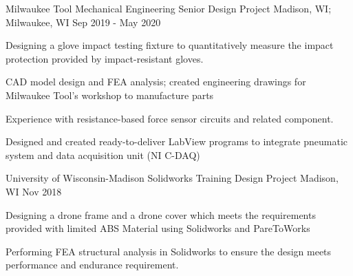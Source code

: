 

\begin{cventries}

  \cventry
    {Milwaukee Tool} %
    {Mechanical Engineering Senior Design Project} %
    {Madison, WI; Milwaukee, WI} %
    {Sep 2019 - May 2020} %
    {
      \begin{cvitems} %
        \item {Designing a glove impact testing fixture to quantitatively measure the impact protection provided by impact-resistant gloves.}
        \item {CAD model design and FEA analysis; created engineering drawings for Milwaukee Tool's workshop to manufacture parts}
        \item {Experience with resistance-based force sensor circuits and related component.}
        \item {Designed and created ready-to-deliver LabView programs to integrate pneumatic system and data acquisition unit (NI C-DAQ)}
      \end{cvitems}
    }


  \cventry
	{University of Wisconsin-Madison} %
	{Solidworks Training Design Project} %
	{Madison, WI} %
	{Nov 2018} %
	{
		\begin{cvitems} %
			\item {Designing a drone frame and a drone cover which meets the requirements provided with limited ABS Material using Solidworks and PareToWorks}
			\item {Performing FEA structural analysis in Solidworks to ensure the design meets performance and endurance requirement. }
		\end{cvitems}
	}




\end{cventries}
